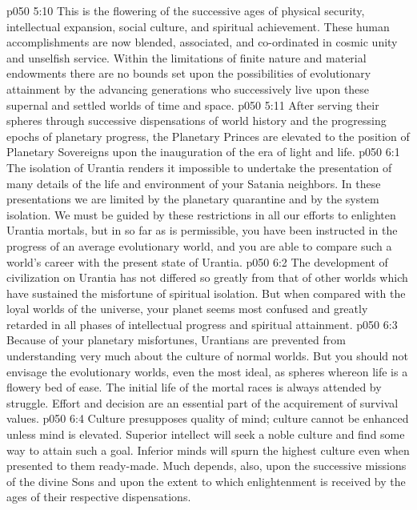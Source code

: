 \pc \vs p050 5:10 \bibnobreakspace {} This is the flowering of the successive ages of physical security, intellectual expansion, social culture, and spiritual achievement. These human accomplishments are now blended, associated, and co\hyp{}ordinated in cosmic unity and unselfish service. Within the limitations of finite nature and material endowments there are no bounds set upon the possibilities of evolutionary attainment by the advancing generations who successively live upon these supernal and settled worlds of time and space.
\pc \vs p050 5:11 After serving their spheres through successive dispensations of world history and the progressing epochs of planetary progress, the Planetary Princes are elevated to the position of Planetary Sovereigns upon the inauguration of the era of light and life.\plusone
{}
\vs p050 6:1 The isolation of Urantia renders it impossible to undertake the presentation of many details of the life and environment of your Satania neighbors. In these presentations we are limited by the planetary quarantine and by the system isolation. We must be guided by these restrictions in all our efforts to enlighten Urantia mortals, but in so far as is permissible, you have been instructed in the progress of an average evolutionary world, and you are able to compare such a world’s career with the present state of Urantia.
\vs p050 6:2 The development of civilization on Urantia has not differed so greatly from that of other worlds which have sustained the misfortune of spiritual isolation. But when compared with the loyal worlds of the universe, your planet seems most confused and greatly retarded in all phases of intellectual progress and spiritual attainment.\plusone
\vs p050 6:3 Because of your planetary misfortunes, Urantians are prevented from understanding very much about the culture of normal worlds. But you should not envisage the evolutionary worlds, even the most ideal, as spheres whereon life is a flowery bed of ease. The initial life of the mortal races is always attended by struggle. Effort and decision are an essential part of the acquirement of survival values.
\vs p050 6:4 Culture presupposes quality of mind; culture cannot be enhanced unless mind is elevated. Superior intellect will seek a noble culture and find some way to attain such a goal. Inferior minds will spurn the highest culture even when presented to them ready\hyp{}made. Much depends, also, upon the successive missions of the divine Sons and upon the extent to which enlightenment is received by the ages of their respective dispensations.

